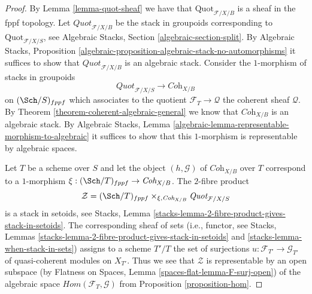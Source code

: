\begin{proof}
By Lemma \ref{lemma-quot-sheaf}
we have that $\text{Quot}_{\mathcal{F}/X/B}$ is a sheaf in the
fppf topology. Let $\textit{Quot}_{\mathcal{F}/X/B}$ be the stack in
groupoids corresponding to $\text{Quot}_{\mathcal{F}/X/S}$, see
Algebraic Stacks, Section \ref{algebraic-section-split}.
By Algebraic Stacks, Proposition
\ref{algebraic-proposition-algebraic-stack-no-automorphisms}
it suffices to show that $\textit{Quot}_{\mathcal{F}/X/B}$
is an algebraic stack.
Consider the $1$-morphism of stacks in groupoids
$$
\textit{Quot}_{\mathcal{F}/X/S}
\longrightarrow
\textit{Coh}_{X/B}
$$
on $(\Sch/S)_{fppf}$ which associates to the quotient
$\mathcal{F}_T \to \mathcal{Q}$ the coherent sheaf $\mathcal{Q}$.
By Theorem \ref{theorem-coherent-algebraic-general} we know that
$\textit{Coh}_{X/B}$ is an algebraic stack.
By Algebraic Stacks, Lemma
\ref{algebraic-lemma-representable-morphism-to-algebraic}
it suffices to show that this $1$-morphism is representable
by algebraic spaces.

\medskip\noindent
Let $T$ be a scheme over $S$ and let the object $(h, \mathcal{G})$ of
$\textit{Coh}_{X/B}$ over $T$ correspond
to a $1$-morphism $\xi : (\Sch/T)_{fppf} \to \textit{Coh}_{X/B}$.
The $2$-fibre product
$$
\mathcal{Z} =
(\Sch/T)_{fppf}
\times_{\xi, \textit{Coh}_{X/B}}
\textit{Quot}_{\mathcal{F}/X/S}
$$
is a stack in setoids, see
Stacks, Lemma \ref{stacks-lemma-2-fibre-product-gives-stack-in-setoids}.
The corresponding sheaf of sets (i.e., functor, see
Stacks, Lemmas
\ref{stacks-lemma-2-fibre-product-gives-stack-in-setoids} and
\ref{stacks-lemma-when-stack-in-sets}) assigns to a scheme
$T'/T$ the set of surjections $u : \mathcal{F}_{T'} \to \mathcal{G}_{T'}$
of quasi-coherent modules on $X_{T'}$. Thus we see that
$\mathcal{Z}$ is representable by an open subspace
(by Flatness on Spaces, Lemma \ref{spaces-flat-lemma-F-surj-open})
of the algebraic space
$\mathit{Hom}(\mathcal{F}_T, \mathcal{G})$ from
Proposition \ref{proposition-hom}.
\end{proof}














